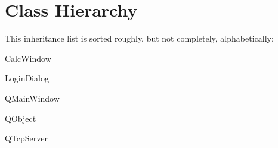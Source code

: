 \section{Class Hierarchy}
This inheritance list is sorted roughly, but not completely, alphabetically\+:\begin{DoxyCompactList}
\item Calc\+Window\begin{DoxyCompactList}
\item {}
\end{DoxyCompactList}
\item {}
\begin{DoxyCompactList}
\item {}
\end{DoxyCompactList}
\item Login\+Dialog\begin{DoxyCompactList}
\item {}
\end{DoxyCompactList}
\item {}
\begin{DoxyCompactList}
\item {}
\end{DoxyCompactList}
\item Q\+Main\+Window\begin{DoxyCompactList}
\item {}
\end{DoxyCompactList}
\item Q\+Object\begin{DoxyCompactList}
\item {}
\end{DoxyCompactList}
\item Q\+Tcp\+Server\begin{DoxyCompactList}
\item {}
\end{DoxyCompactList}

\end{DoxyCompactList}
